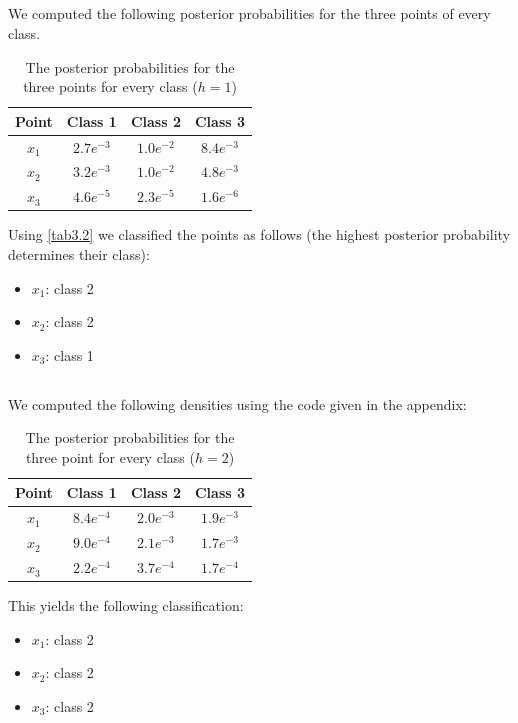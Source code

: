 \documentclass[10pt]{article}
\begin{document}
\subsection{}
We computed the following posterior probabilities for the three points of every class.
\begin{table}[H]
 \centering
 \caption{The posterior probabilities for the three points for every class ($h=1$)}
 \begin{tabular}{c|c|c|c}
  Point & Class 1 & Class 2 & Class 3 \\
  \hline
  $x_1$ & $2.7e^{-3}$ & $1.0e^{-2}$ & $8.4e^{-3}$ \\
  $x_2$ & $3.2e^{-3}$ & $1.0e^{-2}$ & $4.8e^{-3}$ \\
  $x_3$ & $4.6e^{-5}$ & $2.3e^{-5}$ & $1.6e^{-6}$ \\
 \end{tabular}
 \label{tab3.2}
\end{table}
Using \autoref{tab3.2} we classified the points as follows (the highest posterior probability determines their class):
\begin{itemize}
 \item $x_1$: class 2
 \item $x_2$: class 2
 \item $x_3$: class 1
\end{itemize}

\subsection{}
We computed the following densities using the code given in the appendix:
\begin{table}[H]
 \centering
 \caption{The posterior probabilities for the three point for every class ($h=2$)}
 \begin{tabular}{c|c|c|c}
  Point & Class 1 & Class 2 & Class 3 \\
  \hline
  $x_1$ & $8.4e^{-4}$ & $2.0e^{-3}$ & $1.9e^{-3}$ \\
  $x_2$ & $9.0e^{-4}$ & $2.1e^{-3}$ & $1.7e^{-3}$ \\
  $x_3$ & $2.2e^{-4}$ & $3.7e^{-4}$ & $1.7e^{-4}$ \\
 \end{tabular}
 \label{tab3.3}
\end{table}
This yields the following classification:
\begin{itemize}
 \item $x_1$: class 2
 \item $x_2$: class 2
 \item $x_3$: class 2
\end{itemize}
\end{document}
